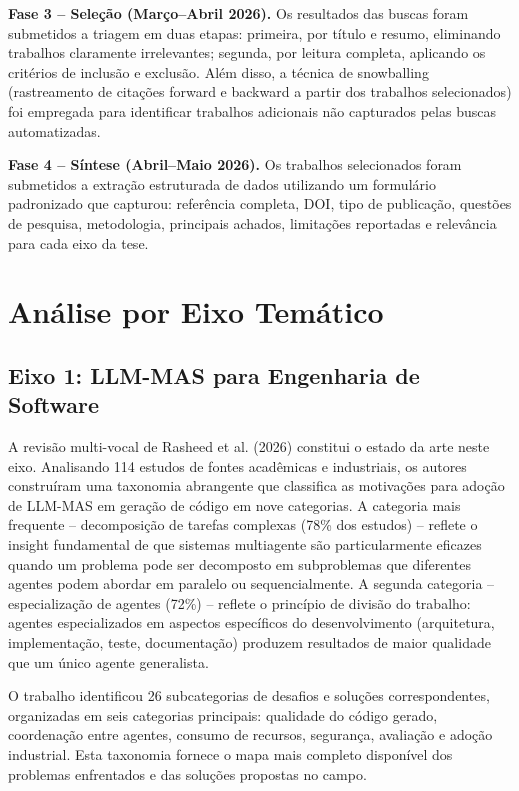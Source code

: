 \documentclass[12pt,a4paper,sumario=tradicional,openany]{abntex2}
\begin{document}
\textbf{Fase 3 -- Seleção (Março--Abril 2026).} Os resultados das buscas foram submetidos a triagem em duas etapas: primeira, por título e resumo, eliminando trabalhos claramente irrelevantes; segunda, por leitura completa, aplicando os critérios de inclusão e exclusão. Além disso, a técnica de snowballing (rastreamento de citações forward e backward a partir dos trabalhos selecionados) foi empregada para identificar trabalhos adicionais não capturados pelas buscas automatizadas.

\textbf{Fase 4 -- Síntese (Abril--Maio 2026).} Os trabalhos selecionados foram submetidos a extração estruturada de dados utilizando um formulário padronizado que capturou: referência completa, DOI, tipo de publicação, questões de pesquisa, metodologia, principais achados, limitações reportadas e relevância para cada eixo da tese.

\section{Análise por Eixo Temático}

\subsection{Eixo 1: LLM-MAS para Engenharia de Software}

A revisão multi-vocal de Rasheed et al. (2026) \cite{rasheed2026llm} constitui o estado da arte neste eixo. Analisando 114 estudos de fontes acadêmicas e industriais, os autores construíram uma taxonomia abrangente que classifica as motivações para adoção de LLM-MAS em geração de código em nove categorias. A categoria mais frequente -- decomposição de tarefas complexas (78\% dos estudos) -- reflete o insight fundamental de que sistemas multiagente são particularmente eficazes quando um problema pode ser decomposto em subproblemas que diferentes agentes podem abordar em paralelo ou sequencialmente. A segunda categoria -- especialização de agentes (72\%) -- reflete o princípio de divisão do trabalho: agentes especializados em aspectos específicos do desenvolvimento (arquitetura, implementação, teste, documentação) produzem resultados de maior qualidade que um único agente generalista.

O trabalho identificou 26 subcategorias de desafios e soluções correspondentes, organizadas em seis categorias principais: qualidade do código gerado, coordenação entre agentes, consumo de recursos, segurança, avaliação e adoção industrial. Esta taxonomia fornece o mapa mais completo disponível dos problemas enfrentados e das soluções propostas no campo.
\end{document}
